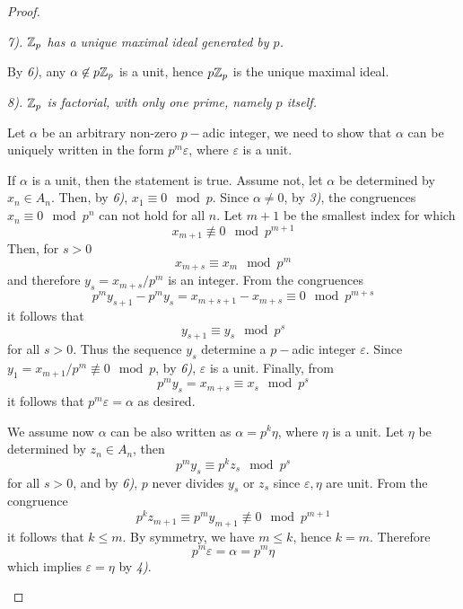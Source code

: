 \begin{proof}
\begin{enumerate}[a)]
        \emph{7). ${\mathbb Z}_p$ has a unique maximal ideal generated by $p$.}

        By \emph{6)}, any $\alpha\not\in p{\mathbb Z}_p$ is a unit, hence $p{\mathbb Z}_p$ is the unique maximal ideal.

        \emph{8). ${\mathbb Z}_p$ is factorial, with only one prime, namely $p$ itself.}

        Let $\alpha$ be an arbitrary non-zero $p-$adic integer, we need to show that $\alpha$ can be uniquely written in the form $p^m\varepsilon$, where $\varepsilon$ is a unit.

        If $\alpha$ is a unit, then the statement is true. Assume not, let $\alpha$ be determined by $x_n\in A_n$.
        Then, by \emph{6)}, $x_1\equiv0\mod p$. Since $\alpha\neq0$, by \emph{3)}, the congruences $x_n\equiv0\mod p^n$ can not hold for all $n$.
        Let $m+1$ be the smallest index for which
        \begin{equation*}
          x_{m+1}\not\equiv0\mod p^{m+1}
        \end{equation*}
        Then, for $s>0$
        \begin{equation*}
          x_{m+s}\equiv x_m \mod p^m
        \end{equation*}
        and therefore $y_s=x_{m+s}/p^m$ is an integer.
        From the congruences
        \begin{equation*}
          p^my_{s+1}-p^my_s=x_{m+s+1}-x_{m+s}\equiv0 \mod p^{m+s}
        \end{equation*}
        it follows that
        \begin{equation*}
          y_{s+1}\equiv y_s \mod p^s
        \end{equation*}
        for all $s>0$. Thus the sequence $y_s$ determine a $p-$adic integer $\varepsilon$. Since $y_1=x_{m+1}/p^m\not\equiv0\mod p$, by \emph{6)}, $\varepsilon$ is a unit.
        Finally, from
        \begin{equation*}
          p^my_s= x_{m+s}\equiv x_s \mod p^s
        \end{equation*}
        it follows that $p^m\varepsilon=\alpha$ as desired.

        We assume now $\alpha$ can be also written as $\alpha=p^k\eta$, where $\eta$ is a unit. Let $\eta$ be determined by $z_n\in A_n$, then
        \begin{equation*}
          p^my_s\equiv p^kz_s \mod p^s
        \end{equation*}
        for all $s>0$, and by \emph{6)}, $p$ never divides $y_s$ or $z_s$ since $\varepsilon,\eta$ are unit.
        From the congruence
        \begin{equation*}
          p^kz_{m+1}\equiv p^my_{m+1}\not\equiv0 \mod p^{m+1}
        \end{equation*}
        it follows that $k\leqslant m$. By symmetry, we have $m\leqslant k$, hence $k=m$.
        Therefore
        \begin{equation*}
          p^m\varepsilon=\alpha=p^m\eta
        \end{equation*}
        which implies $\varepsilon=\eta$ by \emph{4)}.


\end{enumerate}
\end{proof}
